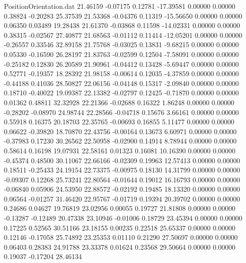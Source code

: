 \begin{filecontents}{PositionOrientation.dat}
  21.46159   -0.07175    0.12781   -17.39581    0.00000    0.00000    0.38824   -0.20283   25.37539
  21.53368   -0.04376    0.11319   -15.56650    0.00000    0.00000    0.06350    0.03489   19.28438
  21.61370   -0.03868    0.11598   -14.02331    0.00000    0.00000    0.38315   -0.02567   27.40877
  21.68563   -0.01112    0.11414   -12.05201    0.00000    0.00000   -0.26557    0.33546   32.89158
  21.75768   -0.03025    0.13831    -9.68215    0.00000    0.00000    0.05330   -0.16590   26.28197
  21.83763   -0.02599    0.12504    -7.58091    0.00000    0.00000   -0.25182    0.12830   26.20589
  21.90961   -0.04412    0.13428    -5.69447    0.00000    0.00000    0.52771   -0.19357   18.28392
  21.98158   -0.00614    0.12035    -4.37859    0.00000    0.00000   -0.44188    0.41036   28.50827
  22.06156   -0.04148    0.15317    -2.09840    0.00000    0.00000    0.18710   -0.40022   19.09387
  22.13382   -0.02797    0.12425    -0.71870    0.00000    0.00000    0.01362    0.48811   32.32928
  22.21366   -0.02688    0.16322     1.86248    0.00000    0.00000   -0.28202   -0.08970   24.98744
  22.28566   -0.04718    0.15676     3.66161    0.00000    0.00000    0.55918    0.16375   20.18703
  22.35765   -0.00693    0.16855     5.11477    0.00000    0.00000    0.06622   -0.39820   18.70870
  22.43756   -0.00164    0.13673     6.60971    0.00000    0.00000   -0.37983    0.17230   30.26562
  22.50958   -0.02900    0.14914     8.78944    0.00000    0.00000    0.58614    0.16198   19.07931
  22.58161    0.01323    0.16081    10.16390    0.00000    0.00000   -0.45374    0.48500   30.11067
  22.66166   -0.02309    0.19963    12.57413    0.00000    0.00000    0.18511   -0.25433   24.19154
  22.73375   -0.00975    0.18130    14.31799    0.00000    0.00000   -0.09307    0.12268   25.73241
  22.80564   -0.01644    0.19012    16.16793    0.00000    0.00000   -0.06840    0.05906   24.53950
  22.88572   -0.02192    0.19485    18.13320    0.00000    0.00000    0.06564   -0.01257   31.46420
  22.95767   -0.01719    0.19394    20.39702    0.00000    0.00000    0.24686    0.04627   19.76819
  23.02956    0.00055    0.19727    21.81808    0.00000    0.00000   -0.13287   -0.12489   20.47338
  23.10946   -0.01006    0.18729    23.45394    0.00000    0.00000    0.17225    0.52565   30.51166
  23.18155    0.00235    0.22518    25.65337    0.00000    0.00000    0.12146   -0.17058   25.74892
  23.25353    0.01110    0.21290    27.50697    0.00000    0.00000    0.06403    0.28383   24.91788
  23.33378    0.01624    0.23568    29.50664    0.00000    0.00000    0.19037   -0.17204   28.46134

\end{filecontents}
